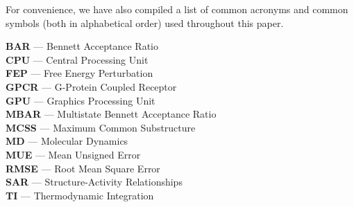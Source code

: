 \documentclass[9pt,bestpractices]{livecoms}
\begin{document}
For convenience, we have also compiled a list of common acronyms and common symbols (both in alphabetical order) used throughout this paper.
\begin{tcolorbox}[title=Acronyms, colback=blue!10!white]
    {\bf BAR} --- Bennett Acceptance Ratio\\
    {\bf CPU} --- Central Processing Unit\\
     {\bf FEP} --- Free Energy Perturbation\\
     {\bf GPCR} --- G-Protein Coupled Receptor\\
     {\bf GPU} --- Graphics Processing Unit\\
     {\bf MBAR} --- Multistate Bennett Acceptance Ratio\\
     {\bf MCSS} --- Maximum Common Substructure\\
     {\bf MD} --- Molecular Dynamics\\
     {\bf MUE} --- Mean Unsigned Error\\
     {\bf RMSE} --- Root Mean Square Error\\
     {\bf SAR} --- Structure-Activity Relationships\\
     {\bf TI} --- Thermodynamic Integration
\end{tcolorbox}
\end{document}
